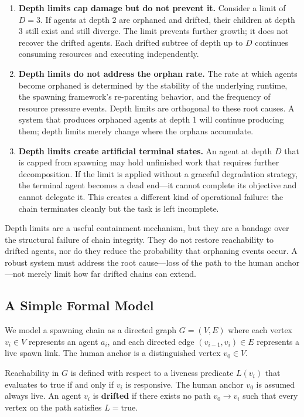 \begin{enumerate}
\item \textbf{Depth limits cap damage but do not prevent it.} Consider a limit of $D = 3$. If agents at depth 2 are orphaned and drifted, their children at depth 3 still exist and still diverge. The limit prevents further growth; it does not recover the drifted agents. Each drifted subtree of depth up to $D$ continues consuming resources and executing independently.

\item \textbf{Depth limits do not address the orphan rate.} The rate at which agents become orphaned is determined by the stability of the underlying runtime, the spawning framework's re-parenting behavior, and the frequency of resource pressure events. Depth limits are orthogonal to these root causes. A system that produces orphaned agents at depth 1 will continue producing them; depth limits merely change where the orphans accumulate.

\item \textbf{Depth limits create artificial terminal states.} An agent at depth $D$ that is capped from spawning may hold unfinished work that requires further decomposition. If the limit is applied without a graceful degradation strategy, the terminal agent becomes a dead end—it cannot complete its objective and cannot delegate it. This creates a different kind of operational failure: the chain terminates cleanly but the task is left incomplete.
\end{enumerate}

Depth limits are a useful containment mechanism, but they are a bandage over the structural failure of chain integrity. They do not restore reachability to drifted agents, nor do they reduce the probability that orphaning events occur. A robust system must address the root cause—loss of the path to the human anchor—not merely limit how far drifted chains can extend.

\subsection{A Simple Formal Model}

We model a spawning chain as a directed graph $G = (V, E)$ where each vertex $v_i \in V$ represents an agent $a_i$, and each directed edge $(v_{i-1}, v_i) \in E$ represents a live spawn link. The human anchor is a distinguished vertex $v_0 \in V$.

Reachability in $G$ is defined with respect to a liveness predicate $L(v_i)$ that evaluates to true if and only if $v_i$ is responsive. The human anchor $v_0$ is assumed always live. An agent $v_i$ is \textbf{drifted} if there exists no path $v_0 \to v_i$ such that every vertex on the path satisfies $L = \text{true}$.

